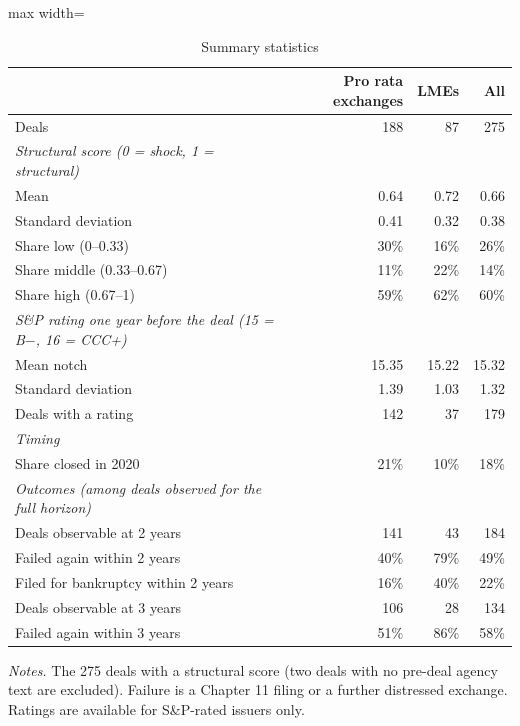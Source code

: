 \begin{table}[H]
\centering
\caption{Summary statistics}
\label{tab:sumstats}
\small
\begin{adjustbox}{max width=\textwidth}
\begin{tabular}{l r r r}
\toprule
 & Pro rata exchanges & LMEs & All \\
\midrule
Deals & 188 & 87 & 275 \\
\addlinespace \textit{Structural score (0 = shock, 1 = structural)} & & & \\
\quad Mean & 0.64 & 0.72 & 0.66 \\
\quad Standard deviation & 0.41 & 0.32 & 0.38 \\
\quad Share low (0--0.33) & 30\% & 16\% & 26\% \\
\quad Share middle (0.33--0.67) & 11\% & 22\% & 14\% \\
\quad Share high (0.67--1) & 59\% & 62\% & 60\% \\
\addlinespace \textit{S\&P rating one year before the deal (15 = B$-$, 16 = CCC+)} & & & \\
\quad Mean notch & 15.35 & 15.22 & 15.32 \\
\quad Standard deviation & 1.39 & 1.03 & 1.32 \\
\quad Deals with a rating & 142 & 37 & 179 \\
\addlinespace \textit{Timing} & & & \\
\quad Share closed in 2020 & 21\% & 10\% & 18\% \\
\addlinespace \textit{Outcomes (among deals observed for the full horizon)} & & & \\
\quad Deals observable at 2 years & 141 & 43 & 184 \\
\quad\quad Failed again within 2 years & 40\% & 79\% & 49\% \\
\quad\quad Filed for bankruptcy within 2 years & 16\% & 40\% & 22\% \\
\quad Deals observable at 3 years & 106 & 28 & 134 \\
\quad\quad Failed again within 3 years & 51\% & 86\% & 58\% \\
\bottomrule
\end{tabular}
\end{adjustbox}
\begin{minipage}{0.9\textwidth}\vspace{4pt}\footnotesize
\textit{Notes.} The 275 deals with a structural score (two deals with no pre-deal agency text are excluded). Failure is a Chapter 11 filing or a further distressed exchange. Ratings are available for S\&P-rated issuers only.
\end{minipage}
\end{table}
